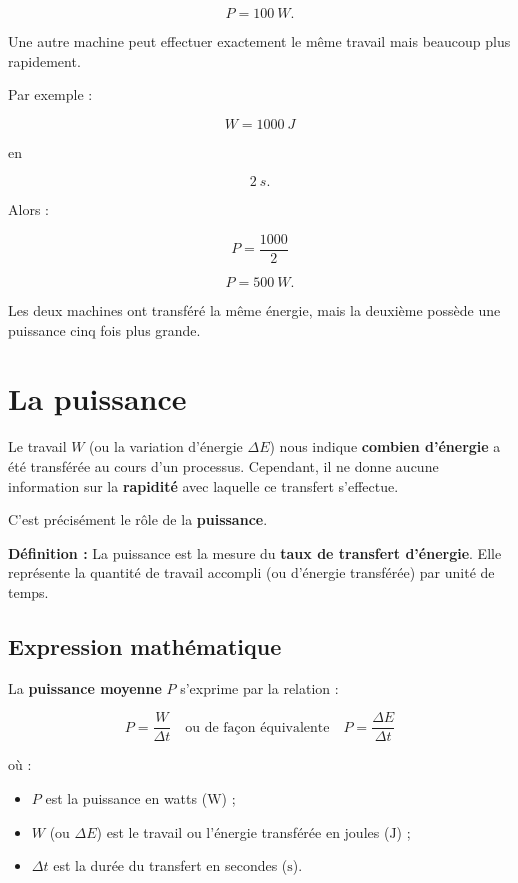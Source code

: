 \documentclass[11pt,openany]{book}
\begin{document}
\[
\boxed{P=\SI{100}{W}}.
\]

Une autre machine peut effectuer exactement le même travail mais
beaucoup plus rapidement.

Par exemple :

\[
W=\SI{1000}{J}
\]

en

\[
\SI{2}{s}.
\]

Alors :

\[
P=\frac{1000}{2}
\]

\[
\boxed{P=\SI{500}{W}}.
\]

Les deux machines ont transféré la même énergie, mais la deuxième
possède une puissance cinq fois plus grande.

\section{La puissance}

Le travail $W$ (ou la variation d'énergie $\Delta E$) nous indique \textbf{combien d'énergie} a été transférée au cours d'un processus. Cependant, il ne donne aucune information sur la \textbf{rapidité} avec laquelle ce transfert s'effectue.

C'est précisément le rôle de la \textbf{puissance}.

\vspace{0.2cm}

\textbf{Définition :} La puissance est la mesure du \textbf{taux de transfert d'énergie}. Elle représente la quantité de travail accompli (ou d'énergie transférée) par unité de temps.

\vspace{0.3cm}

\subsection*{Expression mathématique}

La \textbf{puissance moyenne} $P$ s'exprime par la relation :

\[
\boxed{P = \frac{W}{\Delta t}}
\quad \text{ou de façon équivalente} \quad
\boxed{P = \frac{\Delta E}{\Delta t}}
\]

où :
\begin{itemize}
    \item $P$ est la puissance en watts ($\mathrm{W}$) ;
    \item $W$ (ou $\Delta E$) est le travail ou l'énergie transférée en joules ($\mathrm{J}$) ;
    \item $\Delta t$ est la durée du transfert en secondes ($\mathrm{s}$).
\end{itemize}
\end{document}
